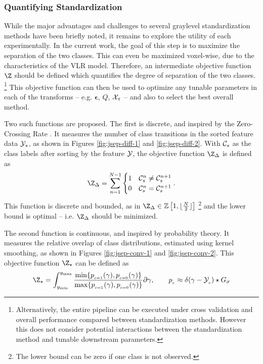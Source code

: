 \subsubsection{Quantifying Standardization}
While the major advantages and challenges to several graylevel standardization methods have been briefly noted, it remains to explore the utility of each experimentally.
In the current work, the goal of this step is to maximize the separation of the two classes.
This can even be maximized voxel-wise, due to the characteristics of the VLR model.
Therefore, an intermediate objective function $\Z$ should be defined which quantifies the degree of separation of the two classes.%
\footnote{Alternatively, the entire pipeline can be executed under cross validation and overall performance compared between standardization methods.
However this does not consider potential interactions between the standardization method and tunable downstream parameters.}
This objective function can then be used to optimize any tunable parameters in each of the transforms -- e.g. $\bm{\epsilon}$, $Q$, $\mathcal{X}_{\uptau}$ --
and also to select the best overall method.
\par
Two such functions are proposed.
The first is discrete, and inspired by the Zero-Crossing Rate \cite{Kedem1986}.
It measures the number of class transitions in the sorted feature data $\mathcal{Y}_s$, as shown in Figures \ref{fig:jsep-diff-1} and \ref{fig:jsep-diff-2}.
With $\mathcal{C}_s$ as the class labels after sorting by the feature $\mathcal{Y}$, the objective function $\Z_{\Delta}$ is defined as
\begin{equation}
\Z_{\Delta} = \sum_{n=1}^{N-1}\begin{cases}
1&\C_s^{n} \ne \C_s^{n+1}\\
0&\C_s^{n}  =  \C_s^{n+1}
\end{cases}.
\end{equation}
This function is discrete and bounded, as in $\Z_{\Delta}\in\mathbb{Z}\left[1,\lfloor\frac{N}{2}\rfloor\right]$%
\footnote{The lower bound can be zero if one class is not observed.}
and the lower bound is optimal -- i.e. $\Z_{\Delta}$ should be minimized.
\par
The second function is continuous, and inspired by probability theory.
It measures the relative overlap of class distributions, estimated using kernel smoothing, as shown in Figures \ref{fig:jsep-conv-1} and \ref{fig:jsep-conv-2}.
This objective function $\Z_{\star}$ can be defined as
\begin{equation}
\Z_{\star} = \int_{y_{\min}}^{y_{\max}}\frac%
{\min\{p_{{}_{c=1}}(\gamma), p_{{}_{c=0}}(\gamma)\}}%
{\max\{p_{{}_{c=1}}(\gamma), p_{{}_{c=0}}(\gamma)\}}\d\gamma,
\qquad p_{{}_{c}} \approx \delta(\gamma-\Y_{{}_{c}}) \star G_{\sigma}
\end{equation}
